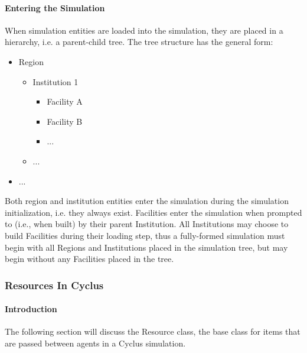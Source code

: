 \documentclass[letterpaper,10pt,english]{sphinxmanual}
\begin{document}
\paragraph{Entering the Simulation}
\label{devdoc/sim_init:entering-the-simulation}
When simulation entities are loaded into the simulation, they are
placed in a hierarchy, i.e. a parent-child tree. The tree structure
has the general form:
\begin{itemize}
\item {} 
Region
\begin{itemize}
\item {} 
Institution 1
\begin{itemize}
\item {} 
Facility A

\item {} 
Facility B

\item {} 
...

\end{itemize}

\item {} 
...

\end{itemize}

\item {} 
...

\end{itemize}

Both region and institution entities enter the simulation during the
simulation initialization, i.e. they always exist. Facilities enter
the simulation when prompted to (i.e., when built) by their parent
Institution. All Institutions may choose to build Facilities during
their loading step, thus a fully-formed simulation must begin with
all Regions and Institutions placed in the simulation tree, but may
begin without any Facilities placed in the tree.


\subsubsection{Resources In Cyclus}
\label{devdoc/resources:resources-in-cyclus}\label{devdoc/resources::doc}

\paragraph{Introduction}
\label{devdoc/resources:introduction}
The following section will discuss the Resource class, the base class for items
that are passed between agents in a Cyclus simulation.
\end{document}
